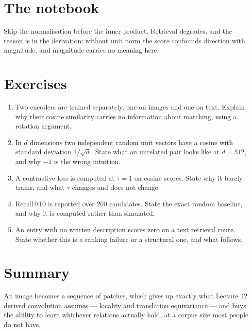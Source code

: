 \documentclass[11pt,a4paper]{article}
\begin{document}
\section{The notebook}

\begin{trybox}[title={What to change}]
Skip the normalisation before the inner product. Retrieval degrades, and the
reason is in the derivation: without unit norm the score confounds direction
with magnitude, and magnitude carries no meaning here.
\end{trybox}

\section{Exercises}

\begin{enumerate}[leftmargin=1.6em,itemsep=4pt]
  \item Two encoders are trained separately, one on images and one on text.
        Explain why their cosine similarity carries no information about
        matching, using a rotation argument. \hfill \scope{[5]}
  \item In $d$ dimensions two independent random unit vectors have a cosine
        with standard deviation $1/\sqrt d$. State what an unrelated pair looks
        like at $d = 512$, and why $-1$ is the wrong intuition.
        \hfill \scope{[5]}
  \item A contrastive loss is computed at $\tau = 1$ on cosine scores. State
        why it barely trains, and what $\tau$ changes and does not change.
        \hfill \scope{[5]}
  \item Recall@10 is reported over 200 candidates. State the exact random
        baseline, and why it is computed rather than simulated.
        \hfill \scope{[3]}
  \item An entry with no written description scores zero on a text retrieval
        route. State whether this is a ranking failure or a structural one, and
        what follows. \hfill \scope{[4]}
\end{enumerate}

\section*{Summary}

An image becomes a sequence of patches, which gives up exactly what Lecture 12
derived convolution assumes --- locality and translation equivariance --- and
buys the ability to learn whichever relations actually hold, at a corpus size
most people do not have.
\end{document}

